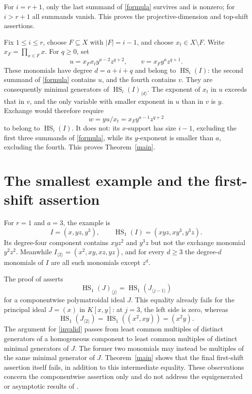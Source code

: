 \documentclass[11pt]{article}
\theoremstyle{remark}\newtheorem{remark}[theorem]{Remark}
\newcommand{\HS}{\operatorname{HS}}
\begin{document}
For $i=r+1$, only the last summand of \eqref{formula} survives and is nonzero; for $i>r+1$ all summands vanish. This proves the projective-dimension and top-shift assertions.

Fix $1\leq i\leq r$, choose $F\subseteq X$ with $|F|=i-1$, and choose $x_t\in X\setminus F$. Write $x_F=\prod_{x\in F}x$. For $q\geq0$, set
\[
 u=x_Fx_t y^{a-2}z^{q+2},\qquad
 v=x_Fy^az^{q+1}.
\]
These monomials have degree $d=a+i+q$ and belong to $\HS_i(I)$: the second summand of \eqref{formula} contains $u$, and the fourth contains $v$. They are consequently minimal generators of $\HS_i(I)_{\langle d\rangle}$. The exponent of $x_t$ in $u$ exceeds that in $v$, and the only variable with smaller exponent in $u$ than in $v$ is $y$. Exchange would therefore require
\[
 w=yu/x_t=x_Fy^{a-1}z^{q+2}
\]
to belong to $\HS_i(I)$. It does not: its $x$-support has size $i-1$, excluding the first three summands of \eqref{formula}, while its $y$-exponent is smaller than $a$, excluding the fourth. This proves Theorem~\ref{main}.

\section{The smallest example and the first-shift assertion}
For $r=1$ and $a=3$, the example is
\[
 I=(x,yz,y^3),\qquad \HS_1(I)=(xyz,xy^3,y^3z).
\]
Its degree-four component contains $xyz^2$ and $y^3z$ but not the exchange monomial $y^2z^2$. Meanwhile $I_{\langle2\rangle}=(x^2,xy,xz,yz)$, and for every $d\geq3$ the degree-$d$ monomials of $I$ are all such monomials except $z^d$.

The proof of \cite[Theorem 10.1]{FL} asserts
\begin{equation}\label{invalid}
 \HS_1(J)_{\langle j\rangle}=\HS_1(J_{\langle j-1\rangle})
\end{equation}
for a componentwise polymatroidal ideal $J$. This equality already fails for the principal ideal $J=(x)$ in $K[x,y]$: at $j=3$, the left side is zero, whereas
\[
 \HS_1(J_{\langle2\rangle})=\HS_1((x^2,xy))=(x^2y).
\]
The argument for \eqref{invalid} passes from least common multiples of distinct generators of a homogeneous component to least common multiples of distinct minimal generators of $J$. The former two monomials may instead be multiples of the same minimal generator of $J$. Theorem~\ref{main} shows that the final first-shift assertion itself fails, in addition to this intermediate equality. These observations concern the componentwise assertion only and do not address the equigenerated or asymptotic results of \cite{FL}.
\end{document}
